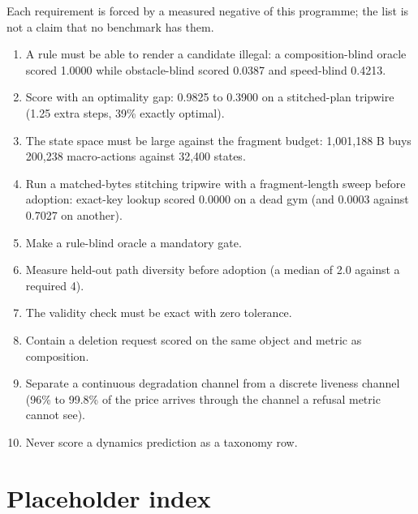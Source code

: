 \documentclass{article} %
\begin{document}
Each requirement is forced by a measured negative of this programme; the list is not a claim that
no benchmark has them. %
\begin{enumerate}[leftmargin=*,itemsep=1pt]
\item A rule must be able to render a candidate illegal: a composition-blind oracle scored 1.0000
  while obstacle-blind scored 0.0387 and speed-blind 0.4213. %
\item Score with an optimality gap: 0.9825 to 0.3900 on a stitched-plan tripwire (1.25 extra steps,
  39\% exactly optimal). %
\item The state space must be large against the fragment budget: 1,001,188 B buys 200,238
  macro-actions against 32,400 states. %
\item Run a matched-bytes stitching tripwire with a fragment-length sweep before adoption: exact-key
  lookup scored 0.0000 on a dead gym (and 0.0003 against 0.7027 on another).
\item Make a rule-blind oracle a mandatory gate.
\item Measure held-out path diversity before adoption (a median of 2.0 against a required 4).
\item The validity check must be exact with zero tolerance.
\item Contain a deletion request scored on the same object and metric as composition.
\item Separate a continuous degradation channel from a discrete liveness channel (96\% to 99.8\% of
  the price arrives through the channel a refusal metric cannot see). %
\item Never score a dynamics prediction as a taxonomy row.
\end{enumerate}

\section{Placeholder index}
\label{app:placeholders}
\end{document}
